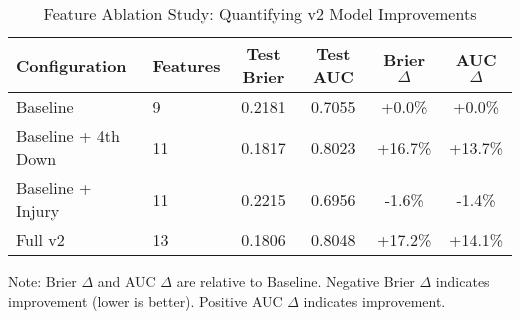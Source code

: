 \begin{table}[t]
  \centering
  \small
  \caption{Feature Ablation Study: Quantifying v2 Model Improvements}
  \begin{tabular}{llcccc}
    \toprule
    Configuration & Features & Test Brier & Test AUC & Brier $\Delta$ & AUC $\Delta$ \\
    \midrule
    Baseline & 9 & 0.2181 & 0.7055 & +0.0\% & +0.0\% \\
    Baseline + 4th Down & 11 & 0.1817 & 0.8023 & +16.7\% & +13.7\% \\
    Baseline + Injury & 11 & 0.2215 & 0.6956 & -1.6\% & -1.4\% \\
    Full v2 & 13 & 0.1806 & 0.8048 & +17.2\% & +14.1\% \\
    \bottomrule
  \end{tabular}
  \label{tab:feature_ablation}
  \footnotesize
  \vspace{0.5em}
  Note: Brier $\Delta$ and AUC $\Delta$ are relative to Baseline. 
  Negative Brier $\Delta$ indicates improvement (lower is better). 
  Positive AUC $\Delta$ indicates improvement.
\end{table}